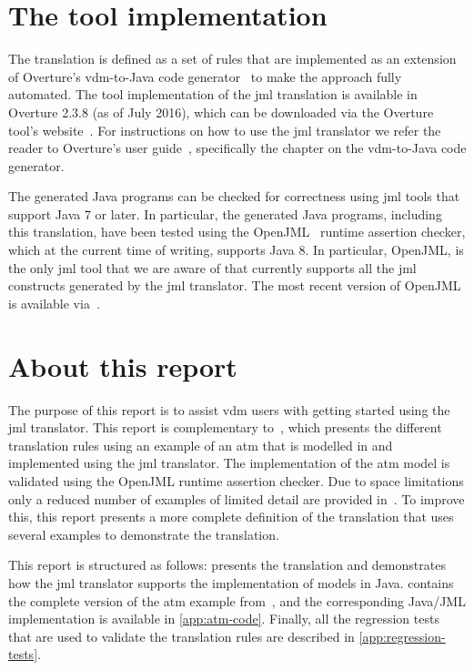 \section{The tool implementation}

The translation is defined as a set of rules that are implemented as
an extension of Overture's \ac{vdm}-to-Java code
generator~\cite{Jorgensen&14a} to make the approach fully
automated. The tool implementation of the \ac{jml} translation is
available in Overture 2.3.8 (as of July 2016), which can be downloaded
via the Overture tool's website~\cite{OvertureWebsite}. For
instructions on how to use the \ac{jml} translator we refer the reader
to Overture's user guide~\cite{Larsen&10d}, specifically the chapter
on the \ac{vdm}-to-Java code generator.

The generated Java programs can be checked for correctness using
\ac{jml} tools that support Java 7 or later. In particular, the
generated Java programs, including this translation, have been tested
using the OpenJML~\cite{Cok&11} runtime assertion checker, which at
the current time of writing, supports Java 8. In particular, OpenJML,
is the only \ac{jml} tool that we are aware of that currently supports
all the \ac{jml} constructs generated by the \ac{jml} translator. The
most recent version of OpenJML is available via~\cite{OpenJMLWebsite}.

\section{About this report}

The purpose of this report is to assist \ac{vdm} users with getting
started using the \ac{jml} translator. This report is complementary
to~\cite{Jorgensen&16a}, which presents the different translation
rules using an example of an \ac{atm} that is modelled in \vsl and
implemented using the \ac{jml} translator. The implementation of the
\ac{atm} model is validated using the OpenJML runtime assertion
checker. Due to space limitations only a reduced number of examples of
limited detail are provided in~\cite{Jorgensen&16a}. To improve this,
this report presents a more complete definition of the translation
that uses several examples to demonstrate the translation.

This report is structured as follows:  presents the
translation and demonstrates how the \ac{jml} translator supports the
implementation of \vsl models in Java.  contains
the complete version of the \ac{atm} example
from~\cite{Jorgensen&16a}, and the corresponding Java/JML
implementation is available in \cref{app:atm-code}. Finally, all the
regression tests that are used to validate the translation rules are
described in \cref{app:regression-tests}.

